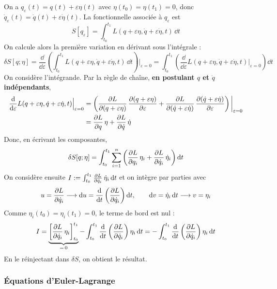 \begin{demonstration}
    On a $q_\varepsilon(t) = q(t) + \varepsilon\eta(t)$ avec
    $\eta(t_0) = \eta(t_1) = 0$, donc $\dot q_\varepsilon(t) =
    \dot q(t) + \varepsilon\dot\eta(t)$. La fonctionnelle associée à
    $q_\varepsilon$ est
    \[
        S[q_\varepsilon] = \int_{t_0}^{t_1}
        L(q+\varepsilon\eta,\dot q+\varepsilon\dot\eta,t)\,\dd t
    \]
    On calcule alors la première variation en dérivant sous
    l'intégrale :
    \[
        \delta S[q;\eta]
        = \frac{\dd}{\dd\varepsilon}\left(\int_{t_0}^{t_1}
        L(q+\varepsilon\eta,\dot q+\varepsilon\dot\eta,t)\,\dd t\right)
        \bigg|_{\varepsilon=0}
        = \int_{t_0}^{t_1}\left(\frac{\dd}{\dd\varepsilon}
        L(q+\varepsilon\eta,\dot q+\varepsilon\dot\eta,t)
        \Big|_{\varepsilon=0}\right)\dd t
    \]
    On considère l'intégrande. Par la règle de chaîne, \textbf{en postulant
    $q$ et $\dot q$ indépendants},
    \begin{align*}
        \frac{\mathrm{d}}{\mathrm{d}\varepsilon}
        L(q+\varepsilon\eta,\dot q+\varepsilon\dot\eta,t)
        \Big|_{\varepsilon=0}
        &= \left(\frac{\partial L}{\partial (q+\varepsilon\eta)}\,
        \frac{\partial (q+\varepsilon\eta)}{\partial \varepsilon}
        + \frac{\partial L}{\partial (\dot q+\varepsilon\dot\eta)}\,
        \frac{\partial (\dot q+\varepsilon\dot\eta)}{\partial \varepsilon}\right)
        \bigg|_{\varepsilon=0}\\
        &= \frac{\partial L}{\partial q}\,\eta + \frac{\partial L}{\partial \dot q}\,\dot\eta
    \end{align*}
    Donc, en écrivant les composantes,
    \[
        \delta S[q;\eta] = \int_{t_0}^{t_1}\sum_{i=1}^{n}
        \left(\frac{\partial L}{\partial q_i}\,\eta_i + \frac{\partial L}{\partial \dot q_i}\,\dot\eta_i\right)
        \mathrm{d} t
    \]
    On considère ensuite $I := \int_{t_0}^{t_1}\frac{\partial L}{\partial \dot q_i}\,
    \dot\eta_i\,\mathrm{d} t$ et on intègre par parties avec
    \[
        u = \frac{\partial L}{\partial \dot q_i} \longrightarrow
        \mathrm{d} u = \frac{\mathrm{d}}{\mathrm{d} t}\left(\frac{\partial L}{\partial \dot q_i}\right)\mathrm{d} t,
        \qquad
        \mathrm{d} v = \dot\eta_i\,\mathrm{d} t \longrightarrow v = \eta_i
    \]
    Comme $\eta_i(t_0) = \eta_i(t_1) = 0$, le terme de bord est nul :
    \[
        I = \underbrace{\left[\frac{\partial L}{\partial \dot q_i}\,\eta_i
        \right]_{t_0}^{t_1}}_{=\,0}
        - \int_{t_0}^{t_1}\frac{\mathrm{d}}{\mathrm{d} t}\left(\frac{\partial L}{\partial \dot q_i}\right)\eta_i\,
        \mathrm{d} t
        = -\int_{t_0}^{t_1}\frac{\mathrm{d}}{\mathrm{d} t}\left(\frac{\partial L}{\partial \dot q_i}\right)\eta_i\,
        \mathrm{d} t
    \]
    En le réinjectant dans $\delta S$, on obtient le résultat.
\end{demonstration}

\subsubsection{Équations d'Euler-Lagrange}

